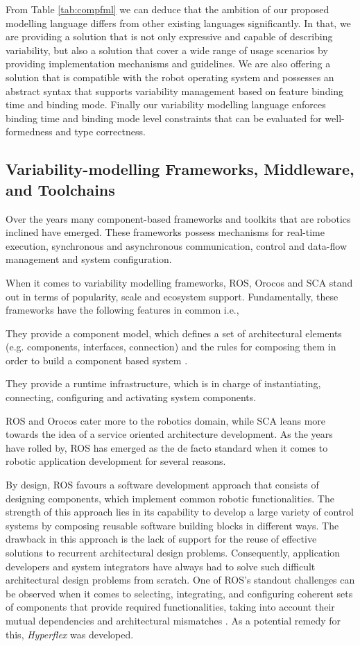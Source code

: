 \documentclass[conference]{IEEEtran}
\begin{document}
From Table \ref{tab:compfml} we can deduce that the ambition of our proposed modelling language differs from other existing languages significantly. In that, we are providing a solution that is not only expressive and capable of describing variability, but also a solution that cover a wide range of usage scenarios by providing implementation mechanisms and guidelines. We are also offering a solution that is compatible with the robot operating system and possesses an abstract syntax that supports variability management based on feature binding time and binding mode. Finally our variability modelling language enforces binding time and binding mode level constraints that can be evaluated for well-formedness and type correctness.

\subsection{Variability-modelling Frameworks, Middleware, and Toolchains}
Over the years many component-based frameworks and toolkits that are robotics inclined
have emerged. These frameworks possess mechanisms for real-time execution, synchronous and asynchronous communication, control and data-flow management and system configuration.

When it comes to variability modelling frameworks, ROS, Orocos and SCA stand out in terms of popularity, scale and ecosystem support. Fundamentally, these frameworks have the following features in common i.e., \begin{enumerate*}[label=(\roman*)]
	\item They provide a component model, which defines a set of architectural
elements (e.g. components, interfaces, connection) and the rules for
composing them in order to build a component based system \cite{lgherardi}.
	\item They provide a runtime infrastructure, which is in charge of instantiating, connecting, configuring and activating system components.
\end{enumerate*} 
ROS and Orocos cater more to the robotics domain, while SCA leans more towards the idea of a service oriented architecture development. As the years have rolled by, ROS has emerged as the de facto standard when it comes to robotic application development for several reasons.

By design, ROS favours a software development approach that consists of designing components, which implement common robotic functionalities. The strength of this approach lies in its capability to develop a large variety of control systems by composing reusable software building blocks in different ways. The drawback in this approach is the lack of support for the
reuse of effective solutions to recurrent architectural design problems. Consequently, application developers and system integrators have always had to solve such difficult architectural design problems from scratch. One of ROS's standout challenges can be observed when it comes to selecting, integrating, and configuring coherent sets of components that provide required functionalities, taking into account their mutual dependencies and architectural mismatches \cite{ros-ref}. As a potential remedy for this, \textit{Hyperflex} was developed.
\end{document}
